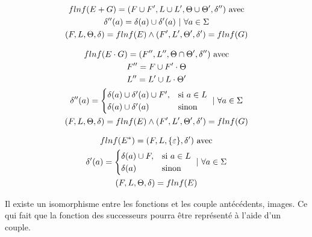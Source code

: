 \begin{gather*}
    flnf(E + G) = (F \cup F', L \cup L', \Theta \cup \Theta', \delta'')~
    \text{avec} \\
    \delta''(a) = \delta(a) \cup \delta'(a) ~|~ \forall a \in \Sigma \notag \\
    (F, L, \Theta, \delta) = flnf(E) \land (F', L', \Theta', \delta') = flnf(G) \notag
\end{gather*}

\begin{gather*}
    flnf(E \cdot G) = (F'', L'', \Theta \cap \Theta', \delta'')~ \text{avec} \\
    F'' = F \cup F' \cdot \Theta \notag \\
    L'' = L' \cup L \cdot \Theta' \notag \\
    \delta''(a) = \begin{cases} \delta(a) \cup \delta'(a) \cup F', & \text{si}~ a \in L \\ \delta(a) \cup \delta'(a) & \text{sinon}\end{cases} ~|~ \forall a \in \Sigma\notag \\
    (F, L, \Theta, \delta) = flnf(E) \land (F', L', \Theta', \delta') = flnf(G) \notag
\end{gather*}

\begin{gather*}
    flnf(E^*) = (F, L, \{\varepsilon\}, \delta')~ \text{avec} \\
    \delta'(a) = \begin{cases} \delta(a) \cup F, & \text{si}~ a \in L \\ \delta(a) & \text{sinon}\end{cases} ~|~ \forall a \in \Sigma\notag \\
    (F, L, \Theta, \delta) = flnf(E) \notag
\end{gather*}

\begin{remark}
    Il existe un isomorphisme entre les fonctions et les couple antécédents,
    images. Ce qui fait que la fonction des successeurs pourra être représenté
    à l'aide d'un couple.
\end{remark}

